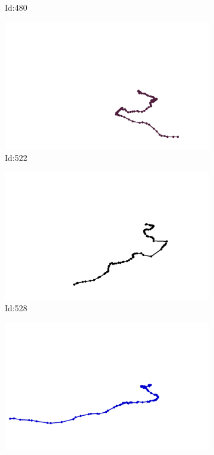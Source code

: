 \documentclass[12pt,twoside]{report}
\begin{document}
\begin{figure}
\begin{subfigure}[b]{0.20\textwidth}
\caption{Id:480}
\end{subfigure}
\begin{subfigure}[b]{0.20\textwidth}
\centering
\includegraphics[width=\textwidth]{../trajectories/522.png}
\caption{Id:522}
\end{subfigure}
\begin{subfigure}[b]{0.20\textwidth}
\centering
\includegraphics[width=\textwidth]{../trajectories/528.png}
\caption{Id:528}
\end{subfigure}
\begin{subfigure}[b]{0.20\textwidth}
\centering
\includegraphics[width=\textwidth]{../trajectories/616.png}

\end{subfigure}
\end{figure}
\end{document}
